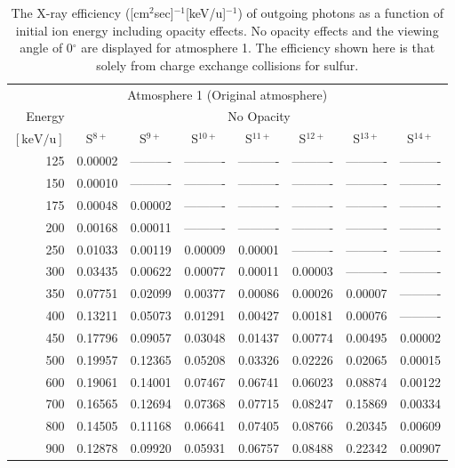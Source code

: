 \begin{table}[ht]
    \centering
    \caption{The X-ray efficiency ([cm$^2$sec]$^{-1}$[keV/u]$^{-1}$) of outgoing photons as a function of initial ion energy including opacity effects. No opacity effects and the viewing angle of 0$^\circ$ are displayed for atmosphere 1. The efficiency shown here is that solely from charge exchange collisions for sulfur.}
    \begin{tabular}{r|c|c|c|c|c|c|c}
    \multicolumn{8}{c}{Atmosphere 1 (Original atmosphere)} \\ \cline{2-8}
    Energy & \multicolumn{7}{c}{No Opacity} \\ \cline{2-8}
    $\mathrm{[keV/u]}$ & S$^{8+}$ & S$^{9+}$ & S$^{10+}$ & S$^{11+}$ & S$^{12+}$ & S$^{13+}$ & S$^{14+}$ \\ \cline{1-8}
      125 & 0.00002 & ---------- & ---------- & ---------- & ---------- & ---------- & ---------- \\
      150 & 0.00010 & ---------- & ---------- & ---------- & ---------- & ---------- & ---------- \\
      175 & 0.00048 & 0.00002 & ---------- & ---------- & ---------- & ---------- & ---------- \\
      200 & 0.00168 & 0.00011 & ---------- & ---------- & ---------- & ---------- & ---------- \\
      250 & 0.01033 & 0.00119 & 0.00009 & 0.00001 & ---------- & ---------- & ---------- \\
      300 & 0.03435 & 0.00622 & 0.00077 & 0.00011 & 0.00003 & ---------- & ---------- \\
      350 & 0.07751 & 0.02099 & 0.00377 & 0.00086 & 0.00026 & 0.00007 & ---------- \\
      400 & 0.13211 & 0.05073 & 0.01291 & 0.00427 & 0.00181 & 0.00076 & ---------- \\
      450 & 0.17796 & 0.09057 & 0.03048 & 0.01437 & 0.00774 & 0.00495 & 0.00002 \\
      500 & 0.19957 & 0.12365 & 0.05208 & 0.03326 & 0.02226 & 0.02065 & 0.00015 \\
      600 & 0.19061 & 0.14001 & 0.07467 & 0.06741 & 0.06023 & 0.08874 & 0.00122 \\
      700 & 0.16565 & 0.12694 & 0.07368 & 0.07715 & 0.08247 & 0.15869 & 0.00334 \\
      800 & 0.14505 & 0.11168 & 0.06641 & 0.07405 & 0.08766 & 0.20345 & 0.00609 \\
      900 & 0.12878 & 0.09920 & 0.05931 & 0.06757 & 0.08488 & 0.22342 & 0.00907 \\

\end{tabular}
\end{table}
